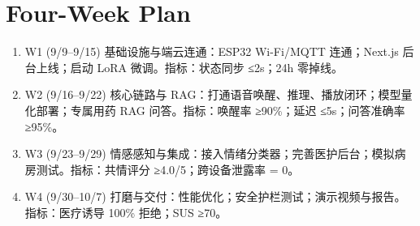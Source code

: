 \documentclass[11pt,a4paper]{article}
\begin{document}
\section{Four-Week Plan}
\begin{enumerate}[leftmargin=*,itemsep=1pt,topsep=2pt]
    \item W1 (9/9–9/15) 基础设施与端云连通：ESP32 Wi-Fi/MQTT 连通；Next.js 后台上线；启动 LoRA 微调。指标：状态同步 ≤2s；24h 零掉线。
    \item W2 (9/16–9/22) 核心链路与 RAG：打通语音唤醒、推理、播放闭环；模型量化部署；专属用药 RAG 问答。指标：唤醒率 ≥90\%；延迟 ≤5s；问答准确率 ≥95\%。
    \item W3 (9/23–9/29) 情感感知与集成：接入情绪分类器；完善医护后台；模拟病房测试。指标：共情评分 ≥4.0/5；跨设备泄露率 = 0。
    \item W4 (9/30–10/7) 打磨与交付：性能优化；安全护栏测试；演示视频与报告。指标：医疗诱导 100\% 拒绝；SUS ≥70。
\end{enumerate}
\end{document}
